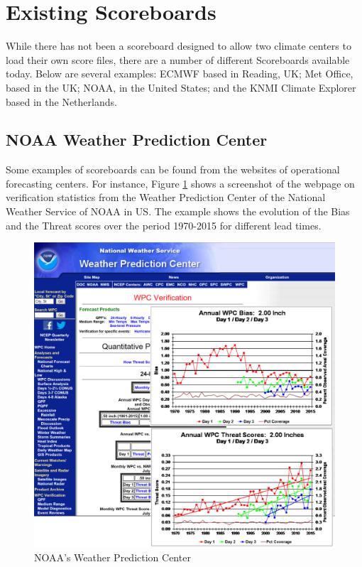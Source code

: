 \documentclass[logos,parttoc,morelanguage=french,morelanguage=german]{orsay-memoire}
\begin{document}
\section{Existing Scoreboards} \label{sec:ExistingScoreboards}

While there has not been a scoreboard designed to allow two climate centers to load their own score files, there are a number of different Scoreboards available today. Below are several examples: ECMWF based in Reading, UK; Met Office, based in the UK; NOAA, in the United States; and the KNMI Climate Explorer based in the Netherlands.


%
%

\subsection*{NOAA Weather Prediction Center}
Some examples of scoreboards can be found from the websites of operational forecasting centers. For instance, Figure \ref{fig:noaaWPC} shows a screenshot of the webpage on verification statistics from the Weather Prediction Center of the National Weather Service of NOAA in US. The example shows the evolution of the Bias and the Threat scores over the period 1970-2015 for different lead times.

\begin{figure}[h]
\centering
\includegraphics[width=0.85\linewidth]{images/exempleNOAAwpc.png}
  \caption{NOAA's Weather Prediction Center}
  \label{fig:noaaWPC}
\end{figure}
\end{document}
